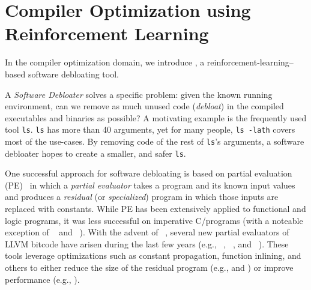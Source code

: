\section{Compiler Optimization using Reinforcement Learning}
In the compiler optimization domain, we introduce \doccam, a reinforcement-learning--based software debloating tool. 

A \emph{Software Debloater} solves a specific problem: given the known running environment, can we remove as much unused code (\emph{debloat}) in the compiled executables and binaries as possible? A motivating example is the frequently used tool \texttt{ls}. \texttt{ls} has more than 40 arguments, yet for many people, \texttt{ls -lath} covers most of the use-cases. By removing code of the rest of \texttt{ls}'s arguments, a software debloater hopes to create a smaller, and safer \texttt{ls}.


One successful approach for software debloating is based on partial
evaluation (PE)~\cite{pe-book} in which a \emph{partial evaluator} takes a
program and its known input values and produces a \emph{residual}
(or \emph{specialized}) program in which those inputs are replaced with constants.
%
%
While PE has been extensively applied to functional and logic programs, it was
less successful on imperative C/\cpp programs (with a noteable exception of
\cmix~\cite{Andersen94} and \tempo~\cite{Consel98}). With the advent of
\llvm~\cite{llvm}, several new partial evaluators of LLVM bitcode have arisen
during the last few years (e.g., \llpe~\cite{llpe}, \occam~\cite{occam}, and
\trimmer~\cite{trimmer}). These tools leverage \llvm optimizations such as
constant propagation, function inlining, and others to either reduce the size of
the residual program (e.g., \occam and \trimmer) or improve performance (e.g.,
\llpe).

